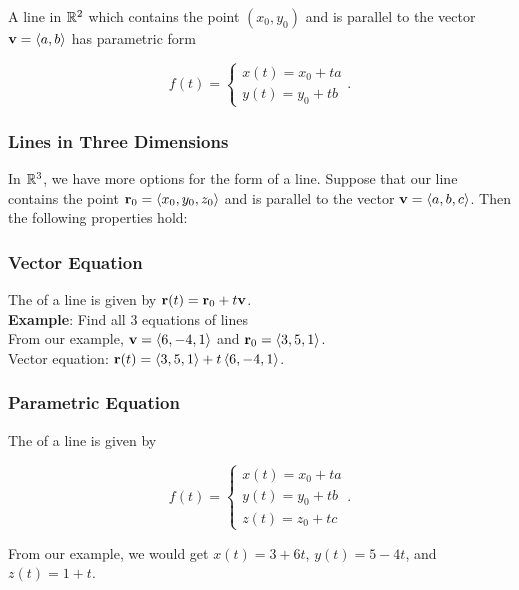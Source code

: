 A line in \(\mathbb{R}^{2}\) which contains the point \((x_{0},y_{0})\) and is parallel to the vector \(\mathbf{v} = \langle a,b \rangle\) has parametric form

\[
    f(t) = \begin{cases}
        x(t) = x_{0} + ta \\
        y(t) = y_{0} + tb
    \end{cases}.
\]

\subsubsection{Lines in Three Dimensions}

In \(\mathbb{R}^{3}\), we have more options for the form of a line. Suppose that our line contains the point \(\mathbf{r}_{0} = \langle x_{0},y_{0},z_{0} \rangle\) and is parallel to the vector \(\mathbf{v} = \langle a,b,c \rangle\). Then the following properties hold:

\subsubsection{Vector Equation}

The  of a line is given by \(\mathbf{r}(t) = \mathbf{r}_{0} + t \mathbf{v}\). \\

\textbf{Example}: Find all 3 equations of lines  \\

From our example, \(\mathbf{v} = \left\langle 6,-4,1 \right\rangle\) and \(\mathbf{r}_{0} = \left\langle 3,5,1 \right\rangle\). \\

Vector equation: \(\mathbf{r}(t) = \left\langle 3,5,1 \right\rangle + t\left\langle 6,-4,1 \right\rangle\).

\subsubsection{Parametric Equation}

The  of a line is given by

\[
    f(t) = \begin{cases}
        x(t) = x_{0} + ta \\
        y(t) = y_{0} + tb \\
        z(t) = z_{0} + tc
    \end{cases}.
\]

From our example, we would get \(x(t) = 3 + 6t\), \(y(t) = 5 - 4t\), and \(z(t) = 1 + t\).

